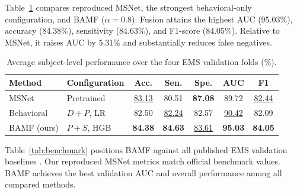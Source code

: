 \documentclass[conference,a4paper]{IEEEtran}
\begin{document}
Table~\ref{tab:main_results} compares reproduced MSNet, the strongest behavioral-only configuration, and BAMF ($\alpha = 0.8$). Fusion attains the highest AUC (95.03\%), accuracy (84.38\%), sensitivity (84.63\%), and F1-score (84.05\%). Relative to MSNet, it raises AUC by 5.31\% and substantially reduces false negatives.

\begin{table}[t]
\caption{Average subject-level performance over the four EMS validation folds (\%).}
\label{tab:main_results}
\centering
\small
\setlength{\tabcolsep}{5pt}
\begin{tabular}{llccccc}
\toprule
Method & Configuration & Acc. & Sen. & Spe. & AUC & F1 \\
\midrule
MSNet & Pretrained & \underline{83.13} & 80.51 & \textbf{87.08} & 89.72 & \underline{82.44} \\
Behavioral & $D+P$, LR & 82.50 & \underline{82.24} & 82.57 & \underline{90.42} & 82.09 \\
BAMF (ours) & $P+S$, HGB & \textbf{84.38} & \textbf{84.63} & \underline{83.61} & \textbf{95.03} & \textbf{84.05} \\
\bottomrule
\end{tabular}
\end{table}

Table~\ref{tab:benchmark} positions BAMF against all published EMS validation baselines \cite{song2024ems}. Our reproduced MSNet metrics match official benchmark values. BAMF achieves the best validation AUC and overall performance among all compared methods.
\end{document}
